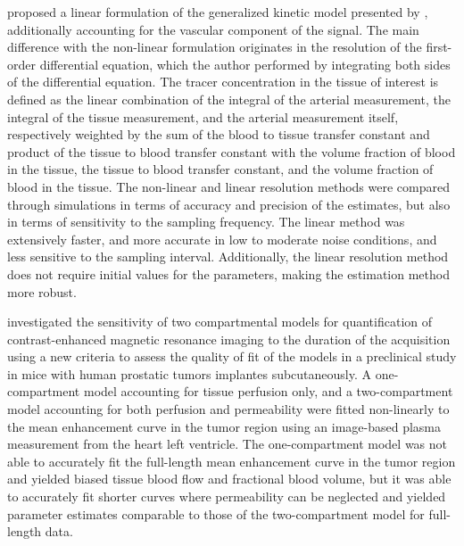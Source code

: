 \citet{Murase:2004kr} proposed a linear formulation of the generalized kinetic model presented by \citet{Tofts:1999ih}, additionally accounting for the vascular component of the signal. 
The main difference with the non-linear formulation originates in the resolution of the first-order differential equation, which the author performed by integrating both sides of the differential equation.
The tracer concentration in the tissue of interest is defined as the linear combination of the integral of the arterial measurement, the integral of the tissue measurement, and the arterial measurement itself, respectively weighted by the sum of the blood to tissue transfer constant and product of the tissue to blood transfer constant with the volume fraction of blood in the tissue, the tissue to blood transfer constant, and the volume fraction of blood in the tissue.
The non-linear and linear resolution methods were compared through simulations in terms of accuracy and precision of the estimates, but also in terms of sensitivity to the sampling frequency.
The linear method was extensively faster, and more accurate in low to moderate noise conditions, and less sensitive to the sampling interval.
Additionally, the linear resolution method does not require initial values for the parameters, making the estimation method more robust.

\citet{Balvay:2005ca} investigated the sensitivity of two compartmental models for quantification of contrast-enhanced magnetic resonance imaging to the duration of the acquisition using a new criteria to assess the quality of fit of the models in a preclinical study in mice with human prostatic tumors implantes subcutaneously.
A one-compartment model accounting for tissue perfusion only, and a two-compartment model accounting for both perfusion and permeability were fitted non-linearly to the mean enhancement curve in the tumor region using an image-based plasma measurement from the heart left ventricle.
The one-compartment model was not able to accurately fit the full-length mean enhancement curve in the tumor region and yielded biased tissue blood flow and fractional blood volume, but it was able to accurately fit shorter curves where permeability can be neglected and yielded parameter estimates comparable to those of the two-compartment model for full-length data.


